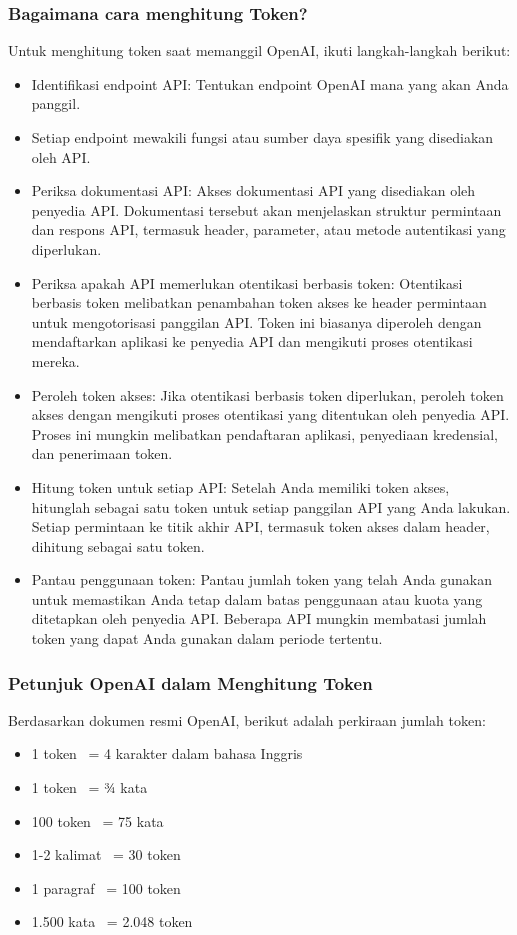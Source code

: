 \documentclass{article}
\begin{document}
\subsubsection{Bagaimana cara menghitung Token?}
Untuk menghitung token saat memanggil OpenAI, ikuti langkah-langkah berikut:
\begin{itemize}
    \item Identifikasi endpoint API: Tentukan endpoint OpenAI mana yang akan Anda panggil.
    \item Setiap endpoint mewakili fungsi atau sumber daya spesifik yang disediakan oleh API.
    \item Periksa dokumentasi API: Akses dokumentasi API yang disediakan oleh penyedia API. Dokumentasi tersebut akan menjelaskan struktur permintaan dan respons API, termasuk header, parameter, atau metode autentikasi yang diperlukan.
    \item Periksa apakah API memerlukan otentikasi berbasis token: Otentikasi berbasis token melibatkan penambahan token akses ke header permintaan untuk mengotorisasi panggilan API. Token ini biasanya diperoleh dengan mendaftarkan aplikasi ke penyedia API dan mengikuti proses otentikasi mereka.
    \item Peroleh token akses: Jika otentikasi berbasis token diperlukan, peroleh token akses dengan mengikuti proses otentikasi yang ditentukan oleh penyedia API. Proses ini mungkin melibatkan pendaftaran aplikasi, penyediaan kredensial, dan penerimaan token.
    \item Hitung token untuk setiap API: Setelah Anda memiliki token akses, hitunglah sebagai satu token untuk setiap panggilan API yang Anda lakukan. Setiap permintaan ke titik akhir API, termasuk token akses dalam header, dihitung sebagai satu token.
    \item Pantau penggunaan token: Pantau jumlah token yang telah Anda gunakan untuk memastikan Anda tetap dalam batas penggunaan atau kuota yang ditetapkan oleh penyedia API. Beberapa API mungkin membatasi jumlah token yang dapat Anda gunakan dalam periode tertentu.
\end{itemize}

\subsubsection{Petunjuk OpenAI dalam Menghitung Token}
Berdasarkan dokumen resmi OpenAI, berikut adalah perkiraan jumlah token:
\begin{itemize}
    \item 1 token ~= 4 karakter dalam bahasa Inggris
    \item 1 token ~= ¾ kata
    \item 100 token ~= 75 kata
    \item 1-2 kalimat ~= 30 token
    \item 1 paragraf ~= 100 token
    \item 1.500 kata ~= 2.048 token
\end{itemize}
\end{document}
